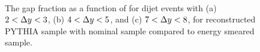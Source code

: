 \begin{figure}
\centering
\mbox{
                              }
\caption[]{
The gap fraction as a function of \qz{} for dijet events with (a) $2<\mbox{$\Delta y$}{}<3$, (b) $4<\mbox{$\Delta y$}{}<5$, and (c) $7<\mbox{$\Delta y$}{}<8$,  for reconstructed PYTHIA sample with nominal sample compared to energy smeared sample.
\label{GBJ2:ResoEnergy:Q0}}
\end{figure}



